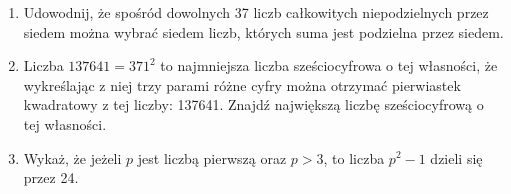 \documentclass[10pt]{article}
\begin{document}
\begin{enumerate}
  \item Udowodnij, że spośród dowolnych 37 liczb całkowitych niepodzielnych przez siedem można wybrać siedem liczb, których suma jest podzielna przez siedem.
  \item Liczba \(137641=371^{2}\) to najmniejsza liczba sześciocyfrowa o tej własności, że wykreślając z niej trzy parami różne cyfry można otrzymać pierwiastek kwadratowy z tej liczby: 137641. Znajdź największą liczbę sześciocyfrową o tej własności.
  \item Wykaż, że jeżeli \(p\) jest liczbą pierwszą oraz \(p>3\), to liczba \(p^{2}-1\) dzieli się przez 24.
\end{enumerate}
\end{document}

